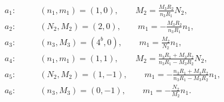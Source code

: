 \begin{equation}
\begin{aligned}
a_1: \qquad & (n_1,m_1)=(1,0), \qquad M_2=\frac{M_3R_2}{n_3R_1}N_2,\\
a_2: \qquad & (N_2,M_2)=(2,0), \qquad  m_1=-\frac{M_3R_2}{n_3R_1}n_1,\\
a_3: \qquad & (n_3,M_3)=(4^b,0), \qquad m_1=\frac{M_2}{N_2}n_1,\\
a_4: \qquad & (n_1,m_1)=(1,1), \qquad M_2=\frac{n_3R_1+M_3R_2}{n_3R_1-M_3R_2}N_2,\\
a_5: \qquad &(N_2,M_2)=(1,-1), \qquad  m_1=-\frac{n_3R_1+M_3R_2}{n_3R_1-M_3R_2}n_1,\\
a_6: \qquad & (n_3,M_3)=(0,-1), \qquad m_1=-\frac{N_2}{M_2}n_1.
\end{aligned}\label{AppWrappings6SUSYcases}
\end{equation}

